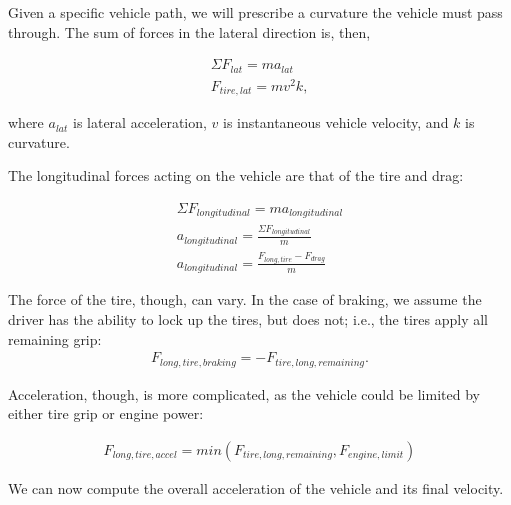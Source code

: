 \documentclass{article}
\begin{document}
Given a specific vehicle path, we will prescribe a curvature the vehicle must pass through. The sum of forces in the lateral direction is, then,

\begin{align}
    \Sigma F_{lat} = m a_{lat} \\
    F_{tire,lat} = m v^2 k, \label{eq_lateral}
\end{align}

where $a_{lat}$ is lateral acceleration, $v$ is instantaneous vehicle velocity, and $k$ is curvature.


%

The longitudinal forces acting on the vehicle are that of the tire and drag:

\begin{align}
	\Sigma F_{longitudinal} = m a_{longitudinal} \\
    a_{longitudinal} = \frac{\Sigma F_{longitudinal}}{m}\\
    a_{longitudinal} = \frac{F_{long,tire} - F_{drag} }{m} \label{eq_accel}
\end{align}

The force of the tire, though, can vary. In the case of braking, we assume the driver has the ability to lock up the tires, but does not; i.e., the tires apply all remaining grip: 
\begin{align}
F_{long,tire,braking} = -F_{tire,long,remaining}. \label{eq_accel_brake}
\end{align}

Acceleration, though, is more complicated, as the vehicle could be limited by either tire grip or engine power:

\begin{align}
	F_{long,tire,accel} = min(F_{tire,long,remaining}, F_{engine,limit})
\end{align}

We can now compute the overall acceleration of the vehicle and its final velocity.
\end{document}
